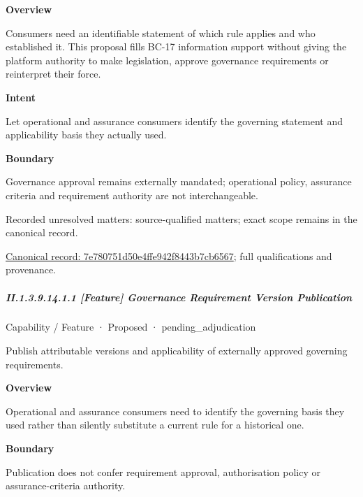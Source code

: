 \textbf{Overview}



Consumers need an identifiable statement of which rule applies and who established it. This proposal fills BC-17 information support without giving the platform authority to make legislation, approve governance requirements or reinterpret their force.



\textbf{Intent}



Let operational and assurance consumers identify the governing statement and applicability basis they actually used.



\textbf{Boundary}



Governance approval remains externally mandated; operational policy, assurance criteria and requirement authority are not interchangeable.


{\small Recorded unresolved matters: source-qualified matters; exact scope remains in the canonical record.}\par
{\footnotesize \href{../../../../../../../continuum/strategy/capability/7e780751d50e4ffe942f8443b7cb6567.md}{Canonical record: 7e780751d50e4ffe942f8443b7cb6567}; full qualifications and provenance.}\par
\subparagraph*{II.1.3.9.14.1.1 [Feature] Governance Requirement Version Publication}
\label{navigation:II.1.3.9.14.1.1}

\label{element:001a067a4b3b46bebfe945f1bef541ce}
{\small Capability / Feature · Proposed · pending\_adjudication}\par

Publish attributable versions and applicability of externally approved governing requirements.



\textbf{Overview}



Operational and assurance consumers need to identify the governing basis they used rather than silently substitute a current rule for a historical one.



\textbf{Boundary}



Publication does not confer requirement approval, authorisation policy or assurance-criteria authority.


